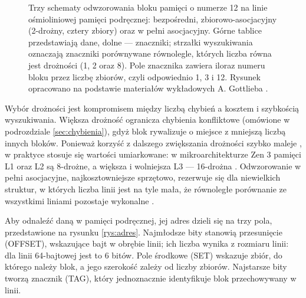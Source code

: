 \documentclass[a4paper,12pt]{book} %
\begin{document}
\begin{figure}[t!]
\caption{Trzy schematy odwzorowania bloku pamięci o numerze 12 na linie ośmioliniowej pamięci podręcznej: bezpośredni, zbiorowo-asocjacyjny (2-drożny, cztery zbiory) oraz w pełni asocjacyjny. Górne tablice przedstawiają dane, dolne --- znaczniki; strzałki wyszukiwania oznaczają znaczniki porównywane równolegle, których liczba równa jest drożności (1, 2 oraz 8). Pole znacznika zawiera iloraz numeru bloku przez liczbę zbiorów, czyli odpowiednio 1, 3 i 12. Rysunek opracowano na podstawie materiałów wykładowych A. Gottlieba \cite{gottlieb_arch_lec22}.}
\label{rys:droznosc}
\end{figure}

Wybór drożności jest kompromisem między liczbą chybień a kosztem i szybkością wyszukiwania. Większa drożność ogranicza chybienia konfliktowe (omówione w podrozdziale \ref{sec:chybienia}), gdyż blok rywalizuje o miejsce z mniejszą liczbą innych bloków. Ponieważ korzyść z dalszego zwiększania drożności szybko maleje \cite{hill1989associativity}, w praktyce stosuje się wartości umiarkowane: w mikroarchitekturze Zen 3 pamięci L1 oraz L2 są 8-drożne, a większa i wolniejsza L3 --- 16-drożna \cite{amd_sog_19h,fog_microarchitecture}. Odwzorowanie w pełni asocjacyjne, najkosztowniejsze sprzętowo, rezerwuje się dla niewielkich struktur, w których liczba linii jest na tyle mała, że równoległe porównanie ze wszystkimi liniami pozostaje wykonalne \cite{hennessy2017architecture}.

Aby odnaleźć daną w pamięci podręcznej, jej adres dzieli się na trzy pola, przedstawione na rysunku \ref{rys:adres}. Najmłodsze bity stanowią przesunięcie (OFFSET), wskazujące bajt w obrębie linii; ich liczba wynika z rozmiaru linii: dla linii 64-bajtowej jest to 6 bitów. Pole środkowe (SET) wskazuje zbiór, do którego należy blok, a jego szerokość zależy od liczby zbiorów. Najstarsze bity tworzą znacznik (TAG), który jednoznacznie identyfikuje blok przechowywany w linii.
\end{document}

